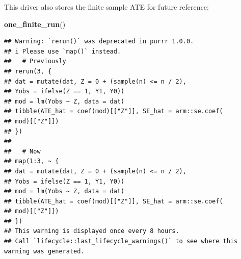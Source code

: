 \documentclass[
]{book}
\newenvironment{Shaded}{\begin{snugshade}}{\end{snugshade}}
\newcommand{\AttributeTok}[1]{\textcolor[rgb]{0.13,0.29,0.53}{#1}}
\newcommand{\ControlFlowTok}[1]{\textcolor[rgb]{0.13,0.29,0.53}{\textbf{#1}}}
\newcommand{\DecValTok}[1]{\textcolor[rgb]{0.00,0.00,0.81}{#1}}
\newcommand{\FunctionTok}[1]{\textcolor[rgb]{0.13,0.29,0.53}{\textbf{#1}}}
\newcommand{\NormalTok}[1]{#1}
\newcommand{\OtherTok}[1]{\textcolor[rgb]{0.56,0.35,0.01}{#1}}
\newcommand{\SpecialCharTok}[1]{\textcolor[rgb]{0.81,0.36,0.00}{\textbf{#1}}}
\newcommand{\StringTok}[1]{\textcolor[rgb]{0.31,0.60,0.02}{#1}}
\begin{document}
\begin{Shaded}
\end{Shaded}

This driver also stores the finite sample ATE for future reference:

\begin{Shaded}
\begin{Highlighting}[]
\FunctionTok{one\_finite\_run}\NormalTok{()}
\end{Highlighting}
\end{Shaded}

\begin{verbatim}
## Warning: `rerun()` was deprecated in purrr 1.0.0.
## i Please use `map()` instead.
##   # Previously
## rerun(3, {
## dat = mutate(dat, Z = 0 + (sample(n) <= n / 2),
## Yobs = ifelse(Z == 1, Y1, Y0))
## mod = lm(Yobs ~ Z, data = dat)
## tibble(ATE_hat = coef(mod)[["Z"]], SE_hat = arm::se.coef(
## mod)[["Z"]])
## })
## 
##   # Now
## map(1:3, ~ {
## dat = mutate(dat, Z = 0 + (sample(n) <= n / 2),
## Yobs = ifelse(Z == 1, Y1, Y0))
## mod = lm(Yobs ~ Z, data = dat)
## tibble(ATE_hat = coef(mod)[["Z"]], SE_hat = arm::se.coef(
## mod)[["Z"]])
## })
## This warning is displayed once every 8 hours.
## Call `lifecycle::last_lifecycle_warnings()` to see where this warning was generated.
\end{verbatim}
\end{document}
